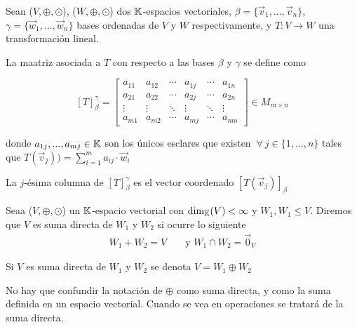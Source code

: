 \begin{definition} \label{def226}
    Sean ($V, \oplus, \odot$), ($W, \oplus, \odot$)  dos $\mathbb{K}$-espacios vectoriales, $\beta =  \{ \vec{v}_{1}, ..., \vec{v}_{n} \}$, $\gamma =  \{ \vec{w}_{1}, ..., \vec{w}_{n} \}$ bases ordenadas de $V$ y $W$ respectivamente, y $T : V \to W$ una transformación lineal.

    La maatriz asociada a $T$ con respecto a las bases $\beta$ y $\gamma$ se define como

    $${\left[ T \right]}_{\beta}^{\gamma} = \begin{bmatrix}
    {a}_{11} & {a}_{12} & \cdots & {a}_{1j} & \cdots & {a}_{1n} \\[1ex]
    {a}_{21} & {a}_{22} & \cdots & {a}_{2j} & \cdots & {a}_{2n} \\[1ex]
    \vdots & \vdots & \ddots & \vdots & \ddots & \vdots \\[1ex]
    {a}_{m1} & {a}_{m2} & \cdots & {a}_{mj} & \cdots & {a}_{mn}
    \end{bmatrix} \in M_{m \times n}$$

    donde ${a}_{1j}, ..., {a}_{mj} \in \mathbb{K}$ son los únicos esclares que existen $\: \forall \: j \in \{ 1, ..., n \}$ tales que $T(\vec{v}_j) ) = \sum_{i=1}^{m}  {a}_{ij} \cdot \vec{w}_i$
\end{definition}

\begin{remark}
    La $j$-ésima columna de ${\left[ T \right]}_{\beta}^{\gamma} $ es el vector coordenado ${\left[ T(\vec{v}_j) \right]}_{\beta}$
\end{remark}

\begin{definition}
    Seaa ($V, \oplus, \odot$) un $\mathbb{K}$-espacio vectorial con $ {\dim}_{\mathbb{K}}(V) < \infty$ y $W_1, W_1 \leq V$. Diremos que $V$ es suma directa de $W_1$ y $W_2$ si ocurre lo siguiente
    \begin{align*}
        W_1 + W_2 = V && \text{ y } W_1 \cap W_2 = \vec{0}_V
    \end{align*}
\end{definition}

\begin{notation}
    Si $V$ es suma directa de $W_1$ y $W_2$ se denota $V = W_1 \oplus W_2$
\end{notation}

\begin{remark}
    No hay que confundir la notación de $\oplus$ como suma directa, y como la suma definida en un espacio vectorial. Cuando se vea en operaciones se tratará de la suma directa. 
\end{remark}

